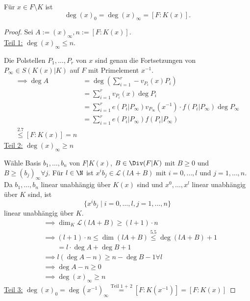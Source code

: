 \begin{satz}
    Für $x \in F \setminus K$ ist 
    $$ \deg (x)_0 = \deg (x)_\infty = [F:K(x)].$$
\end{satz}
\begin{proof}
    Sei $ A := (x)_\infty, n := [F:K(x)]$.\\
    \underline{Teil 1:} $\deg (x)_\infty \leq n$.

    Die Polstellen $P_1,\ldots, P_r$ von  $x$ sind genau die Fortsetzungen von $P_\infty \in S(K(x)|K)$
    auf $F$ mit Primelement $x^{-1}$.
    \begin{align*}
        \implies \deg A &= \deg \left(\sum\limits_{i=1}^r -v_{P_i}(x)P_i\right)\\
        &= \sum\limits_{i=1}^r v_{P_i}(x) \deg P_i\\
        &= \sum\limits_{i=1}^r e(P_i | P_\infty)v_{P_\infty}(x^{-1})\cdot f(P_i|P_\infty)\deg P_\infty\\
        &= \sum\limits_{i=1}^r e(P_i | P_\infty)f(P_i|P_\infty)\\
        \stackrel{2.7}{\leq} [F: K(x)] = n
    \end{align*}
    \underline{Teil 2:} $\deg (x)_\infty \geq n$

    Wähle Basis $b_1,\ldots,b_n$ von $F|K(x)$, $B \in \Div(F|K)$ mit $B \geq 0$ und $B \geq (b_j)_\infty \forall j$.
    Für $l \in \N$ ist $x^i b_j \in \mathcal{L}(lA+B)$ mit $i=0,\ldots,l$ und $j=1,\ldots,n$.
    Da $b_1,\ldots,b_n$ linear unabhängig über $K(x)$ sind und $x^0, \ldots, x^l$ linear unabhängig über $K$ sind,
    ist $$ \{x^i b_j \mid i=0, \ldots,l, j=1, \ldots,n\}$$ linear unabhängig über $K$.
    \begin{align*}
        &\implies \dim_K \mathcal{L}(lA + B) \geq (l + 1) \cdot n\\
        &\implies (l + 1) \cdot n \leq \dim (lA + B) \stackrel{5.5}{\leq} \deg (lA + B) + 1\\
        &\qquad = l \cdot \deg A + \deg B + 1\\
        & \implies l(\deg A - n) \geq n - \deg B - 1 \forall l\\
        &\implies \deg A - n \geq 0 \\
        &\implies \deg (x)_\infty \geq n
    \end{align*}
    \underline{Teil 3:} $\deg (x)_0 = \deg (x^{-1})_\infty \stackrel{\text{Teil 1 + 2}}{=} [F: K(x^{-1})] = [F:K(x)]$
\end{proof}

